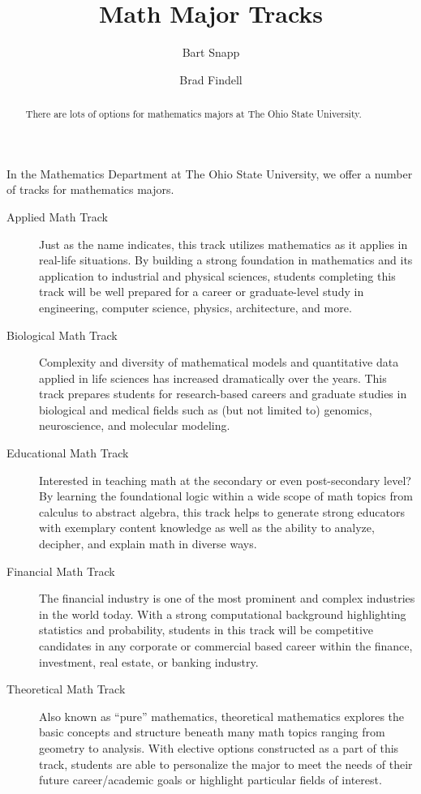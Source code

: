 \documentclass[handout,nooutcomes,space]{ximera}
\title{Math Major Tracks}
\author{Bart Snapp \and Brad Findell}
\begin{document}
\begin{abstract}
There are lots of options for mathematics majors at The Ohio State University. 
\end{abstract}
\maketitle

In the Mathematics Department at The Ohio State University, we offer a
number of tracks for mathematics majors.

\begin{description}
\item[Applied Math Track] Just as the name indicates, this track
  utilizes mathematics as it applies in real-life situations.  By
  building a strong foundation in mathematics and its application to
  industrial and physical sciences, students completing this track
  will be well prepared for a career or graduate-level study in
  engineering, computer science, physics, architecture, and more.
 
\item[Biological Math Track] Complexity and diversity of mathematical
  models and quantitative data applied in life sciences has increased
  dramatically over the years.  This track prepares students for
  research-based careers and graduate studies in biological and
  medical fields such as (but not limited to) genomics, neuroscience,
  and molecular modeling.
 
\item[Educational Math Track] Interested in teaching math at the
  secondary or even post-secondary level?  By learning the
  foundational logic within a wide scope of math topics from calculus
  to abstract algebra, this track helps to generate strong educators
  with exemplary content knowledge as well as the ability to analyze,
  decipher, and explain math in diverse ways.
 
\item[Financial Math Track] The financial industry is one of the most
  prominent and complex industries in the world today.  With a strong
  computational background highlighting statistics and probability,
  students in this track will be competitive candidates in any
  corporate or commercial based career within the finance, investment,
  real estate, or banking industry.
 
\item[Theoretical Math Track] Also known as ``pure'' mathematics,
  theoretical mathematics explores the basic concepts and structure
  beneath many math topics ranging from geometry to analysis.  With
  elective options constructed as a part of this track, students are
  able to personalize the major to meet the needs of their future
  career/academic goals or highlight particular fields of interest.
\end{description}
\end{document}
